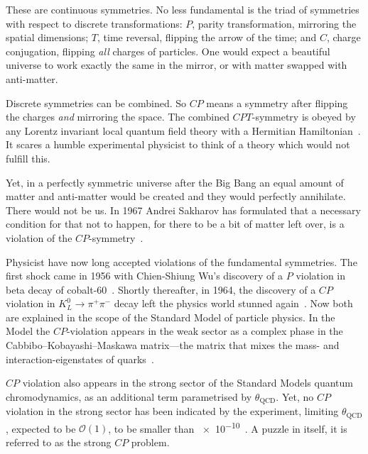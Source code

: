 These are continuous symmetries. No less fundamental is the triad of symmetries with respect to discrete transformations: $P$, parity transformation, mirroring the spatial dimensions; $T$, time reversal, flipping the arrow of the time; and $C$, charge conjugation, flipping \emph{all} charges of particles. One would expect a beautiful universe to work exactly the same in the mirror, or with matter swapped with anti-matter.

Discrete symmetries can be combined. So $CP$ means a symmetry after flipping the charges \emph{and} mirroring the space. The combined $CPT$-symmetry is obeyed by any Lorentz invariant local quantum field theory with a Hermitian Hamiltonian~\cite{Sachs1987}. It scares a humble experimental physicist to think of a theory which would not fulfill this.

Yet, in a perfectly symmetric universe after the Big Bang an equal amount of matter and anti-matter would be created and they would perfectly annihilate. There would not be us.
In 1967 Andrei Sakharov
has formulated that a necessary condition for that not to happen, for there to be a bit of matter left over, is a violation of the $CP$-symmetry~\cite{0038-5670-34-5-A08}.

Physicist have now long accepted violations of the fundamental symmetries.
The first shock came in 1956 with Chien-Shiung Wu's discovery of a $P$ violation in beta decay of cobalt-60~\cite{PhysRev.105.1413}. Shortly thereafter, in 1964, the discovery of a $CP$ violation in $K^0_L \rightarrow \pi^+ \pi^-$ decay left the physics world stunned again~\cite{PhysRevLett.13.138}. Now both are explained in the scope of the Standard Model of particle physics. In the Model the $CP$-violation appears in the weak sector as a complex phase in the Cabbibo--Kobayashi--Maskawa matrix---the matrix that mixes the mass- and interaction-eigenstates of quarks~\cite{doi:10.1143/PTP.49.652}.

$CP$ violation also appears in the strong sector of the Standard Models quantum chromodynamics, as an additional term parametrised by $\theta_\text{QCD}$. Yet, no $CP$ violation in the strong sector has been indicated by the experiment, limiting  $\theta_\text{QCD}$, expected to be $\mathcal{O}(1)$, to be smaller than \num{e-10}~\cite{PDG2016}. A puzzle in itself, it is referred to as the strong $CP$ problem.

